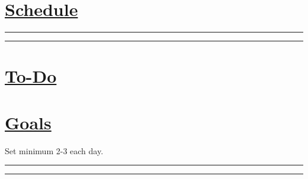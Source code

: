 \documentclass[11pt]{article}
\begin{document}
\begin{multicols}{2}

\section*{\underline{Schedule}} 
  \begin{todolist}[itemsep=8pt]
    \item 
	\item  
    \item 
    \item 
    \item
    \item 
    \item 
    \item     
    \item 
    \item 
  \end{todolist}

\begin{flushleft}
\rule{122pt}{1pt}\vline\rule{122pt}{1pt}
\end{flushleft}


\section*{\underline{To-Do}}
  \begin{todolist}[itemsep=8pt]
    \item 
    \item 
    \item 
    \item 
    \item 
  \end{todolist}

\columnbreak

\section*{\underline{Goals}}
Set minimum 2-3 each day.
  \begin{todolist}[itemsep=8pt]
    \item 
    \item 
    \item 
    \item 
    \item 
  \end{todolist}

\begin{flushleft}
\rule{125pt}{1pt}\vline\rule{125pt}{1pt}
\end{flushleft}


\end{multicols}
\end{document}
